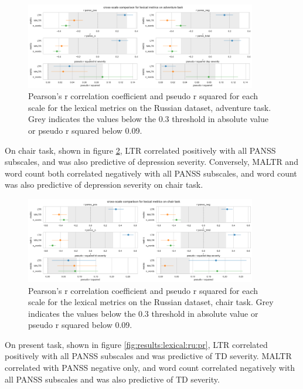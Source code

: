 \begin{figure}[ht!]
    \includegraphics[width=0.9\textwidth, center]{Figures/chapter_4/lexical/ru_adventure_scale_r.png} 
\captionsetup{width=\textwidth}
\caption[Lexical Metrics: Russian, Adventure Task]{\label{fig:results:lexical:ru:ad} Pearson's r correlation coefficient and pseudo r squared for each scale for the lexical metrics on the Russian dataset, adventure task. Grey indicates the values below the 0.3 threshold in absolute value or pseudo r squared below 0.09.}
\end{figure}

On chair task, shown in figure \ref{fig:results:lexical:ch}, LTR correlated positively with all PANSS subscales, and was also predictive of depression severity. Conversely, MALTR and word count both correlated negatively with all PANSS subscales, and word count was also predictive of depression severity on chair task.

\begin{figure}[ht!]
    \includegraphics[width=0.9\textwidth, center]{Figures/chapter_4/lexical/ru_chair_scale_r.png} 
\captionsetup{width=\textwidth}
\caption[Lexical Metrics: Russian, Chair Task]{\label{fig:results:lexical:ch} Pearson's r correlation coefficient and pseudo r squared for each scale for the lexical metrics on the Russian dataset, chair task. Grey indicates the values below the 0.3 threshold in absolute value or pseudo r squared below 0.09.}
\end{figure}

On present task, shown in figure \ref{fig:results:lexical:ru:pr}, LTR correlated positively with all PANSS subscales and was predictive of TD severity. MALTR correlated with PANSS negative only, and word count correlated negatively with all PANSS subscales and was also predictive of TD severity.

